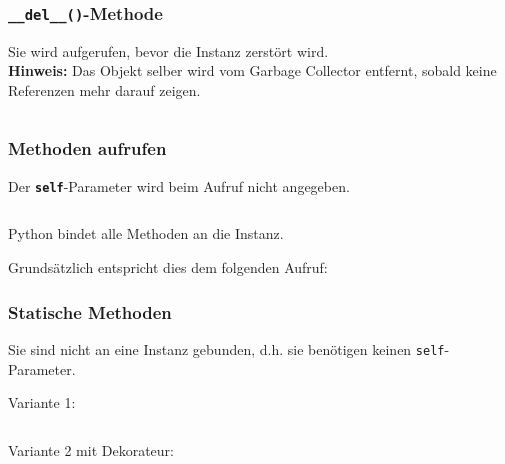 \begin{minipage}[t]{0.49\textwidth}
	\subsubsection{\texttt{\_\_del\_\_()}-Methode}
	Sie wird aufgerufen, bevor die Instanz zerstört wird.\\
	\textbf{Hinweis:} Das Objekt selber wird vom Garbage Collector entfernt, sobald keine Referenzen mehr darauf zeigen.
\end{minipage}
\begin{minipage}[t]{0.02\textwidth} $\quad$ \end{minipage}
\begin{minipage}[t]{0.49\textwidth}
	
\end{minipage}


\subsubsection{Methoden aufrufen}
\begin{minipage}[t]{0.49\textwidth}
	Der \textbf{\texttt{self}}-Parameter wird beim Aufruf nicht angegeben.
	
\end{minipage}
\begin{minipage}[t]{0.02\textwidth} $\quad$ \end{minipage}
\begin{minipage}[t]{0.49\textwidth}
	Python bindet alle Methoden an die Instanz.
	
\end{minipage}
Grundsätzlich entspricht dies dem folgenden Aufruf:




\subsubsection{Statische Methoden}
Sie sind nicht an eine Instanz gebunden, d.h. sie benötigen keinen \texttt{self}-Parameter.\\

\begin{minipage}[t]{0.49\textwidth}
	Variante 1:
	
\end{minipage}
\begin{minipage}[t]{0.02\textwidth} $\quad$ \end{minipage}
\begin{minipage}[t]{0.49\textwidth}
	Variante 2 mit Dekorateur:
	
\end{minipage}



